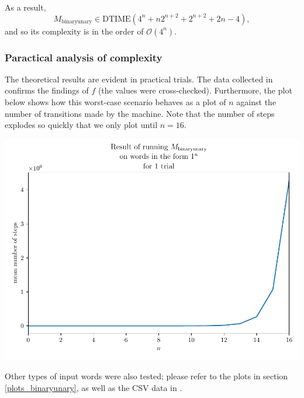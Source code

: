 As a result,
$$ M_\text{binaryunary} \in \text{DTIME}(4^n + n 2^{n+2} + 2^{n+2} + 2n - 4), $$
and so its complexity is in the order of $\mathcal{O}(4^n)$.

\subsubsection{Paractical analysis of complexity}

The theoretical results are evident in practical trials. The data collected in  confirms the findings of $f$ (the values were cross-checked). Furthermore, the plot below shows how this worst-case scenario behaves as a plot of $n$ against the number of transitions made by the machine. Note that the number of steps explodes so quickly that we only plot until $n=16$.

\begin{center}
    \includegraphics[width=\textwidth]{images/plots/binaryunary-ones.pdf}
\end{center}

Other types of input words were also tested; please refer to the plots in section \ref{plots_binaryunary}, as well as the CSV data in . 